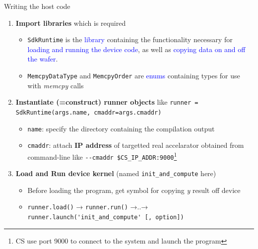 \documentclass[dvipdfmx, 11pt, aspectratio=169]{beamer}   %
\begin{document}
\begin{frame}[fragile]{Writing the host code}
\begin{enumerate}
    \item \textbf{Import libraries} which is required
    \begin{itemize}
        \item \lstinline|SdkRuntime| is the \textcolor{blue}{library} containing the functionality necessary for \textcolor{blue}{loading and running the device code}, as well as \textcolor{blue}{copying data on and off the wafer}.
        \item \lstinline|MemcpyDataType| and \lstinline|MemcpyOrder| are \textcolor{blue}{enums} containing types for use with \textit{memcpy} calls
    \end{itemize}
    \item \textbf{Instantiate (=construct) runner objects} like \lstinline|runner = SdkRuntime(args.name, cmaddr=args.cmaddr)| %
    \begin{itemize}
        \item \lstinline|name|: specify the directory containing the compilation output
        \item \lstinline|cmaddr|: attach \textbf{IP address} of targetted real accelarator obtained from command-line like \lstinline|--cmaddr $CS_IP_ADDR:9000|\footnote{CS use port 9000 to connect to the system and launch the program}
    \end{itemize}
    \item \textbf{Load and Run device kernel} (named \lstinline|init_and_compute| here)
    \begin{itemize}
        \item Before loading the program, get symbol for copying \textit{y} result off device
        \item \lstinline|runner.load()| → \lstinline|runner.run()| →..→ \lstinline|runner.launch('init_and_compute' [, option])|
    \end{itemize}
\end{enumerate}
\end{frame}
\end{document}
